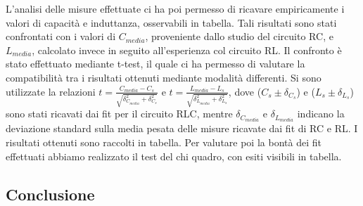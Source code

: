 \documentclass[a4paper]{article}
\begin{document}
L'analisi delle misure effettuate ci ha poi permesso di ricavare empiricamente i valori di capacità e induttanza, osservabili in tabella.
Tali risultati sono stati confrontati con i valori di $C_{media}$, proveniente dallo studio del circuito RC, e $L_{media}$, calcolato invece in seguito all'esperienza col circuito RL. Il confronto è stato effettuato mediante t-test, il quale ci ha permesso di valutare la compatibilità tra i risultati ottenuti mediante modalità differenti. Si sono utilizzate la relazioni  \( t = \frac {C_{media} - C_s}{\sqrt{\delta_{C_{media}}^2+\delta_{C_s}^2}} \) e \( t = \frac {L_{media} - L_s}{\sqrt{\delta_{L_{media}}^2+\delta_{L_s}^2}} \), dove ($C_s \pm  \delta_{C_s}$) e ($L_s \pm  \delta_{L_s}$) sono stati ricavati dai fit per il circuito RLC, mentre $\delta_{C_{media}}$ e $\delta_{L_{media}}$ indicano la deviazione standard sulla media pesata delle misure ricavate dai fit di RC e RL. I risultati ottenuti sono raccolti in tabella.
Per valutare poi la bontà dei fit effettuati abbiamo realizzato il test del chi quadro, con esiti visibili in tabella.

\subsection{Conclusione}
\end{document}
